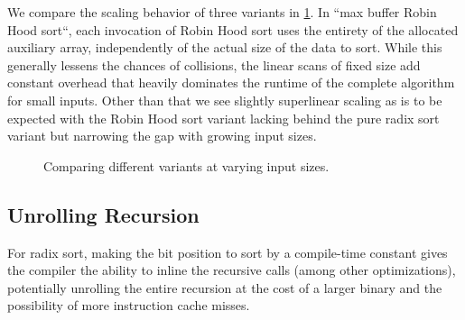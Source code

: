 \documentclass[a4paper,UKenglish,cleveref, autoref, thm-restate]{template/lipics-v2021}
\begin{document}
	We compare the scaling behavior of three variants in \cref{fig:comp}.
	In ``max buffer Robin Hood sort``, each invocation of Robin Hood sort uses the entirety of the allocated auxiliary array, independently of the actual size of the data to sort.
	While this generally lessens the chances of collisions, the linear scans of fixed size add constant overhead that heavily dominates the runtime of the complete algorithm for small inputs.
	Other than that we see slightly superlinear scaling as is to be expected with the Robin Hood sort variant lacking behind the pure radix sort variant but narrowing the gap with growing input sizes.
	
	\begin{figure}[h]
		\centering
		\caption{Comparing different variants at varying input sizes.}
		\label{fig:comp}
	\end{figure}
	
	\subsection{Unrolling Recursion}
	\label{sec:ur}
	
	For radix sort, making the bit position to sort by a compile-time constant gives the compiler the ability to inline the recursive calls (among other optimizations), potentially unrolling the entire recursion at the cost of a larger binary and the possibility of more instruction cache misses.
	
\end{document}
